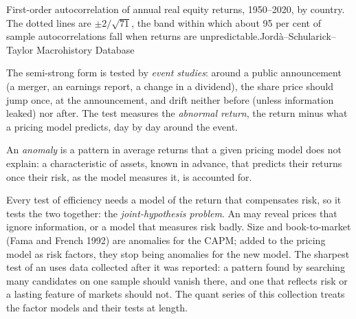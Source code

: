 \begin{omchart}{First-order autocorrelation of annual real equity returns, 1950--2020, by country. The
  dotted lines are $\pm 2/\sqrt{71}$, the band within which about 95 per cent of sample
  autocorrelations fall when returns are unpredictable.}{Jord\`a--Schularick--Taylor Macrohistory
  Database}
\end{omchart}

The semi-strong form is tested by \emph{event studies}: around a public announcement (a merger, an
earnings report, a change in a dividend), the share price should jump once, at the announcement, and
drift neither before (unless information leaked) nor after. The test measures the \emph{abnormal
return}, the return minus what a pricing model predicts, day by day around the event.

\begin{definition}[Anomaly]\label{def:b2:asset-prices:anomaly}
An \emph{anomaly} is a pattern in average returns that a given pricing
model does not explain: a characteristic of assets, known in advance, that predicts their returns once
their risk, as the model measures it, is accounted for.
\end{definition}

Every test of efficiency needs a model of the return that compensates risk, so it tests the two
together: the \emph{joint-hypothesis problem}. An  may reveal prices that ignore information, or
a model that measures risk badly. Size and book-to-market (Fama and French 1992) are anomalies for the
CAPM; added to the pricing model as risk factors, they stop being anomalies for the new model. The
sharpest test of an  uses data collected after it was reported: a pattern found by searching many
candidates on one sample should vanish there, and one that reflects risk or a lasting feature of
markets should not. The quant series of this collection treats the factor models and their tests at
length.

